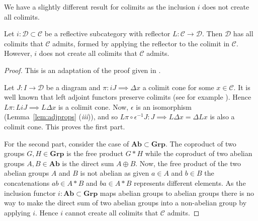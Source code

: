 We have a slightly different result for colimits as the inclusion $ i $ does not create all colimits.
\begin{proposition}
    \label{prop:colims}
    Let $ i:\mathcal{D} \subset \mathcal{C} $ be a reflective subcategory with reflector $ L: \mathcal{C} \to \mathcal{D} $. Then $ \mathcal{D} $ has all colimits that $ \mathcal{C} $ admits, formed by applying the reflector to the colimit in $ \mathcal{C} $. However, $ i $ does not create all colimits that $ \mathcal{C} $ admits.
\end{proposition}
\begin{proof}
  This is an adaptation of the proof given in \cite[Proposition 4.5.15 (ii)]{riehl2017category}.

  Let $ J: I \to \mathcal{D} $ be a diagram and $ \pi: iJ \implies \Delta x $ a colimit cone for some $ x \in \mathcal{C} $. It is well known that left adjoint functors preserve colimits (see for example \cite[Theorem 4.5.3]{riehl2017category}). Hence $ L\pi: LiJ \implies L\Delta x $ is a colimit cone. Now, $ \epsilon $ is an isomorphism (Lemma~\ref{lem:adjprops} (\textit{iii})), and so $ L\pi \circ \epsilon^{-1} J: J \implies L\Delta x = \Delta Lx $ is also a colimit cone. This proves the first part.


  For the second part, consider the case of $ \mathbf{Ab} \subset \mathbf{Grp} $. The coproduct of two groups $ G,H \in \mathbf{Grp} $ is the free product $ G * H $ while the coproduct of two abelian groups $ A,B \in \mathbf{Ab} $ is the direct sum $ A \oplus B $. Now, the free product of the two abelian groups $ A $ and $ B $ is not abelian as given $ a \in A $ and $ b \in B $ the concatenations $ ab \in A * B $ and $ ba \in A * B $ represents different elements. As the inclusion functor $ i: \mathbf{Ab} \subset \mathbf{Grp} $ maps abelian groups to abelian groups there is no way to make the direct sum of two abelian groups into a non-abelian group by applying $ i $. Hence $ i $ cannot create all colimits that $ \mathcal{C} $ admits.
\end{proof}
